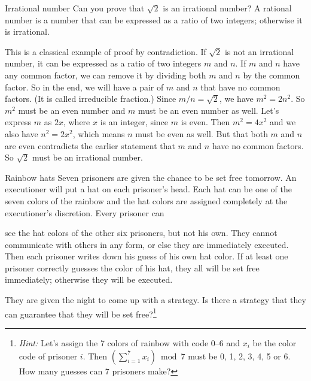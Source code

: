 \begin{problem}{Irrational number}
Can you prove that $\sqrt{2}$ is an irrational number? A rational number is a number that can be expressed as a ratio of two integers; otherwise it is irrational.
\end{problem}

\begin{solution}
This is a classical example of proof by contradiction. If $\sqrt{2}$ is not an irrational number, it can be expressed as a ratio of two integers $m$ and $n$. If $m$ and $n$ have any common factor, we can remove it by dividing both $m$ and $n$ by the common factor. So in the end, we will have a pair of $m$ and $n$ that have no common factors. (It is called irreducible fraction.) Since $m/n=\sqrt{2}$, we have $m^2=2n^2$. So $m^2$ must be an even number and $m$ must be an even number as well. Let's express $m$ as $2x$, where $x$ is an integer, since $m$ is even. Then $m^2=4x^2$ and we also have $n^2=2x^2$, which means $n$ must be even as well. But that both $m$ and $n$ are even contradicts the earlier statement that $m$ and $n$ have no common factors. So $\sqrt{2}$ must be an irrational number.

\end{solution}

\begin{problem}{Rainbow hats}
Seven prisoners are given the chance to be set free tomorrow. An executioner will put a hat on each prisoner's head. Each hat can be one of the seven colors of the rainbow and the hat colors are assigned completely at the executioner's discretion. Every prisoner can

see the hat colors of the other six prisoners, but not his own. They cannot communicate with others in any form, or else they are immediately executed. Then each prisoner writes down his guess of his own hat color. If at least one prisoner correctly guesses the color of his hat, they all will be set free immediately; otherwise they will be executed.

They are given the night to come up with a strategy. Is there a strategy that they can guarantee that they will be set free?\footnote[19]{\emph{Hint:} Let's assign the 7 colors of rainbow with code 0--6 and $x_i$ be the color code of prisoner $i$. Then $\displaystyle\left(\sum_{i=1}^{7}x_i\right)\bmod 7$ must be 0, 1, 2, 3, 4, 5 or 6. How many guesses can 7 prisoners make?}
\end{problem}

